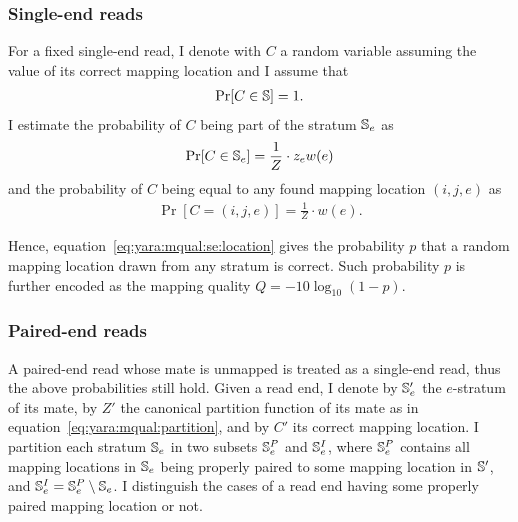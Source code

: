 \subsubsection{Single-end reads}

For a fixed single-end read, I denote with $C$ a random variable assuming the value of its correct mapping location and I assume that
\begin{eqnarray}
\Pr[C \in \mathbb{S}] = 1.
\end{eqnarray}
I estimate the probability of $C$ being part of the stratum $\mathbb{S}_e$ as
\begin{eqnarray}
\label{eq:yara:mqual:se:stratum}
\Pr[C \in \mathbb{S}_e] = \frac{1}{Z} \cdot z_e w(e)
\end{eqnarray}
and the probability of $C$ being equal to any found mapping location $(i,j,e)$ as
\begin{eqnarray}
\label{eq:yara:mqual:se:location}
\Pr[C = (i,j,e)] = \frac{1}{Z} \cdot w(e).
\end{eqnarray}


Hence, equation~\ref{eq:yara:mqual:se:location} gives the probability $p$ that a random mapping location drawn from any stratum is correct.
Such probability $p$ is further encoded as the mapping quality $Q=-10 \log_{10}(1-p)$.

\subsubsection{Paired-end reads}

A paired-end read whose mate is unmapped is treated as a single-end read, thus the above probabilities still hold.
Given a read end, I denote by $\mathbb{S}'_e$ the $e$-stratum of its mate, by $Z'$ the canonical partition function of its mate as in equation~\ref{eq:yara:mqual:partition}, and by $C'$ its correct mapping location.
I partition each stratum $\mathbb{S}_e$ in two subsets $\mathbb{S}^P_e$ and $\mathbb{S}^I_e$, where $\mathbb{S}^P_e$ contains all mapping locations in $\mathbb{S}_e$ being properly paired to some mapping location in $\mathbb{S}'$, and $\mathbb{S}^I_e = \mathbb{S}^P_e \setminus \mathbb{S}_e$.
I distinguish the cases of a read end having some properly paired mapping location or not.


